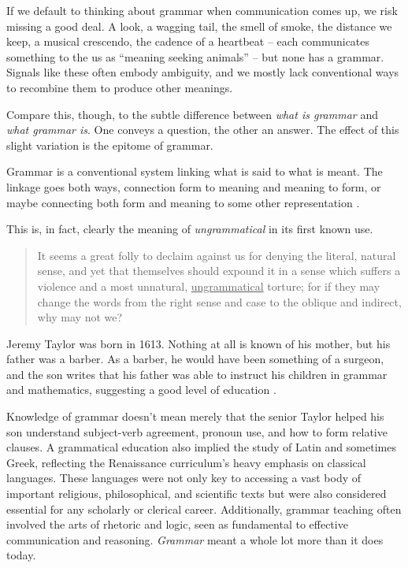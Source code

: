 If we default to thinking about grammar when communication comes up, we risk missing a good deal. A look, a wagging tail, the smell of smoke, the distance we keep, a musical crescendo, the cadence of a heartbeat -- each communicates something to the us as ``meaning seeking animals'' \citep[436]{Geertz1957} -- but none has a grammar. Signals like these often embody ambiguity, and we mostly lack conventional ways to recombine them to produce other meanings.

Compare this, though, to the subtle difference between \textit{what is grammar} and \textit{what grammar is}. One conveys a question, the other an answer. The effect of this slight variation is the epitome of grammar.

Grammar is a conventional system linking what is said to what is meant. The linkage goes both ways, connection form to meaning and meaning to form, or maybe connecting both form and meaning to some other representation \citep[371]{Futrell2020}.

This is, in fact, clearly the meaning of \textit{ungrammatical} in its first known use.

\begin{quote}
    It seems a great folly to declaim against us for denying the literal, natural sense, and yet that themselves should expound it in a sense which suffers a violence and a most unnatural, \uline{ungrammatical} torture; for if they may change the words from the right sense and case to the oblique and indirect, why may not we?\hfill\citep{taylor1654real}
\end{quote}

Jeremy Taylor was born in 1613. Nothing at all is known of his mother, but his father was a barber. As a barber, he would have been something of a surgeon, and the son writes that his father was able to instruct his children in grammar and mathematics, suggesting a good level of education \citep[28]{worley_jeremy_taylor_1904}. 

Knowledge of grammar doesn't mean merely that the senior Taylor helped his son understand subject-verb agreement, pronoun use, and how to form relative clauses. A grammatical education also implied the study of Latin and sometimes Greek, reflecting the Renaissance curriculum's heavy emphasis on classical languages. These languages were not only key to accessing a vast body of important religious, philosophical, and scientific texts but were also considered essential for any scholarly or clerical career. Additionally, grammar teaching often involved the arts of rhetoric and logic, seen as fundamental to effective communication and reasoning. \textit{Grammar} meant a whole lot more than it does today.

